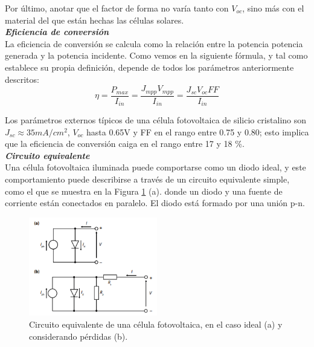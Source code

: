 \documentclass[12pt]{article}
\begin{document}
	\noindent Por último, anotar que el factor de forma no varía tanto con $V_{oc}$, sino más con el material del que están hechas las células solares. \\
	

	\noindent \textit{\textbf{Eficiencia de conversión}} \\
	
	\noindent La eficiencia de conversión se calcula como la relación entre la potencia potencia generada y la potencia incidente.  Como vemos en la siguiente fórmula, y tal como establece su propia definición, depende de todos los parámetros anteriormente descritos: \\
	
	\begin{equation}
		 \eta = \frac{P_{max}}{I_{in}} = \frac{J_{mpp} V_{mpp}}{I_{in}} = \frac{J_{sc} V_{oc} FF}{I_{in}} 
	\end{equation}
	
	\noindent Los parámetros externos típicos de una célula fotovoltaica de silicio cristalino son $J_{sc} \approx 35 mA/cm^2$, $V_{oc}$ hasta 0.65V y FF en el rango entre 0.75 y 0.80; esto implica que la eficiencia de conversión caiga en el rango entre 17 y 18 \%. \\
	
	\noindent \textit{\textbf{Circuito equivalente}} \\
	
	\noindent Una célula fotovoltaica iluminada puede comportarse como un diodo ideal, y este comportamiento puede describirse a través de un circuito equivalente simple, como el que se muestra en la Figura \ref{fig: equivalent circuit solar cell} (a). donde un diodo y una fuente de corriente están conectados en paralelo. El diodo está formado por una unión p-n. \\
	
	\begin{figure}[h]
		\begin{center}
			\includegraphics[width=0.5\textwidth]{img/circuitEquivalent_solarCell.png}
			\caption{Circuito equivalente de una célula fotovoltaica, en el caso ideal (a) y considerando pérdidas (b).}
			\label{fig: equivalent circuit solar cell}
		\end{center}
	\end{figure}
	
\end{document}
